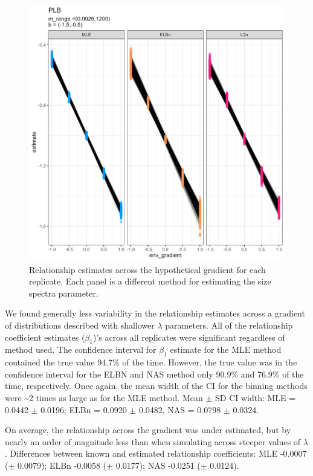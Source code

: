 \documentclass[
]{article}
\begin{document}
\begin{figure}
\centering
\includegraphics{figures/shallow_lambda_main.png}
\caption{Relationship estimates across the hypothetical gradient for
each replicate. Each panel is a different method for estimating the size
spectra parameter.}
\end{figure}

We found generally less variability in the relationship estimates across
a gradient of distributions described with shallower \(\lambda\)
parameters. All of the relationship coefficient estimates
(\(\beta_1\))'s across all replicates were significant regardless of
method used. The confidence interval for \(\beta_1\) estimate for the
MLE method contained the true value 94.7\% of the time. However, the
true value was in the confidence interval for the ELBN and NAS method
only 90.9\% and 76.9\% of the time, respectively. Once again, the mean
width of the CI for the binning methods were \textasciitilde2 times as
large as for the MLE method. Mean \(\pm\) SD CI width: MLE = 0.0442
\(\pm\) 0.0196; ELBn = 0.0920 \(\pm\) 0.0482, NAS = 0.0798 \(\pm\)
0.0324.

On average, the relationship across the gradient was under estimated,
but by nearly an order of magnitude less than when simulating across
steeper values of \(\lambda\). Differences between known and estimated
relationship coefficients: MLE -0.0007 (\(\pm\) 0.0079); ELBn -0.0058
(\(\pm\) 0.0177); NAS -0.0251 (\(\pm\) 0.0124).
\end{document}
